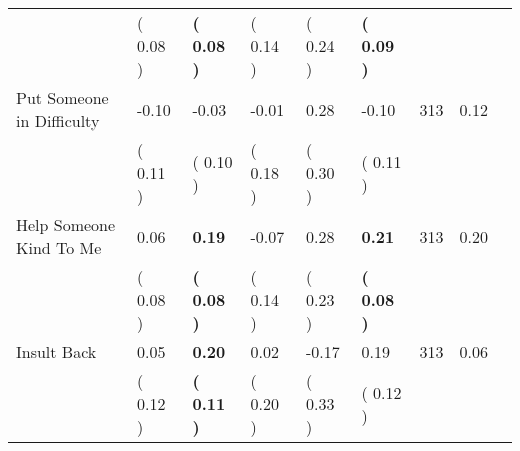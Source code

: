 \begin{tabular}{L{6.2cm} C{1.8cm} C{1.8cm} C{1.8cm} C{1.8cm} C{1.8cm} C{1.8cm} C{0.3cm} C{0.3cm}}
 & (     0.08 ) & \textbf{(     0.08 )} & (     0.14 ) & (     0.24 ) & \textbf{(     0.09 )}  & \\
Put Someone in Difficulty &     -0.10 &     -0.03 &     -0.01 &      0.28 &     -0.10  & 313 &       0.12 \\ 
 & (     0.11 ) & (     0.10 ) & (     0.18 ) & (     0.30 ) & (     0.11 )  & \\
Help Someone Kind To Me &      0.06 & \textbf{     0.19} &     -0.07 &      0.28 & \textbf{     0.21}  & 313 &       0.20 \\ 
 & (     0.08 ) & \textbf{(     0.08 )} & (     0.14 ) & (     0.23 ) & \textbf{(     0.08 )}  & \\
Insult Back &      0.05 & \textbf{     0.20} &      0.02 &     -0.17 &      0.19  & 313 &       0.06 \\ 
 & (     0.12 ) & \textbf{(     0.11 )} & (     0.20 ) & (     0.33 ) & (     0.12 )  & \\
\bottomrule
\end{tabular}
